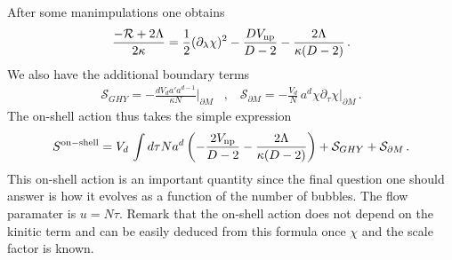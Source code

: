 \documentclass[a4paper]{article}
\def\sp{\;\;\;,\;\;\;}
\begin{document}
After some manimpulations one obtains
\begin{equation}
  \frac{-\mathcal{R}+2\Lambda}{2\kappa}=\frac{1}{2}(\partial_\lambda \chi)^2-\frac{DV_{\rm np}}{D-2}-\frac{2\Lambda}{\kappa(D-2)}\,.
\end{equation}
We also have the additional boundary terms
\begin{equation}
  \begin{aligned}
    \mathcal{S}_{GHY} = -\frac{dV_{d}a'a^{d-1}}{\kappa N}\Bigg|_{\partial M}\sp \mathcal{S}_{\partial M} = -\frac{V_d}{N}\,a^d \chi \partial_\tau \chi \Bigg|_{\partial M}\,.
  \end{aligned}
\end{equation}
The on-shell action thus takes the simple expression
\begin{equation}\label{eq:on-shell_action}
  S^{\rm on-shell} = V_{d}\,\int d\tau N a^{d}\left(-\frac{2V_{\rm np}}{D-2}-\frac{2\Lambda}{\kappa(D-2)}\right)+\mathcal{S}_{GHY}+\mathcal{S}_{\partial M}\,.
\end{equation}
This on-shell action is an important quantity since the final question one should answer is how it evolves as a function of the number of bubbles. The flow paramater is $u= N \tau$. Remark that the on-shell action does not depend on the kinitic term and can be easily deduced from this formula once $\chi$ and the scale factor is known. 
\end{document}
